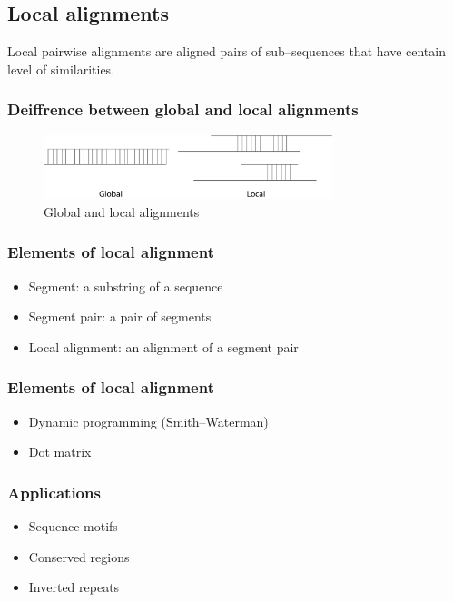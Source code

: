 %
%

%
%
\subsection{Local alignments}
Local pairwise alignments are aligned pairs of sub--sequences that have centain level of similarities.

%
%
\subsubsection*{Deiffrence between global and local alignments} 

\begin{figure}[H]
  \centering
      \includegraphics[width=0.75\textwidth]{fig04/global_and_local_alignments.png}
  \caption{Global and local alignments}
\end{figure}

%
%
\subsubsection*{Elements of local alignment}
\begin{itemize}
\item Segment: a substring of a sequence
\item Segment pair: a pair of segments
\item Local alignment: an alignment of a segment pair
\end{itemize}

%
%
\subsubsection*{Elements of local alignment}
\begin{itemize}
\item Dynamic programming (Smith--Waterman)
\item Dot matrix
\end{itemize}

%
%
\subsubsection*{Applications}
\begin{itemize}
\item Sequence motifs
\item Conserved regions
\item Inverted repeats
\end{itemize}

\bigskip 

%
